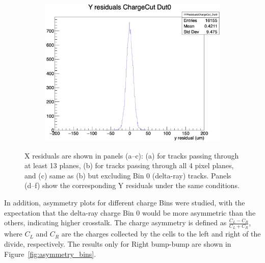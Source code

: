 \begin{figure}[H]
\begin{subfigure}[b]{0.3\textwidth}
        \includegraphics[width=\textwidth]{images/YRes_noBin0_4pixel.png}
        \caption{}
    \end{subfigure}

    \caption{X residuals are shown in panels (a--c): (a) for tracks passing through at least 13 planes, (b) for tracks passing through all 4 pixel planes, and (c) same as (b) but excluding Bin 0 (delta-ray) tracks. Panels (d--f) show the corresponding Y residuals under the same conditions.}
    \label{fig:X_Y_Residual_planes}
\end{figure}

In addition, asymmetry plots for different charge Bins were studied, with the expectation that the delta-ray charge Bin 0 would be more asymmetric than the others, indicating higher crosstalk. The charge asymmetry is defined as \( \frac{C_L - C_R}{C_L + C_R} \), where \( C_L \) and \( C_R \) are the charges collected by the cells to the left and right of the divide, respectively.
The results only for Right bump-bump are shown in Figure~\ref{fig:asymmetry_bins}.

